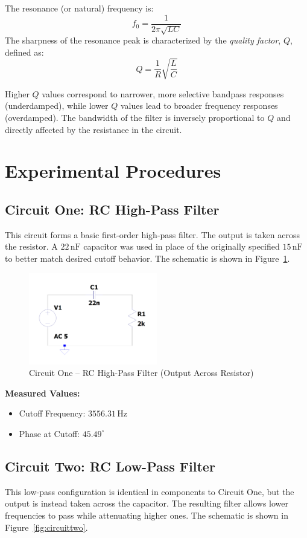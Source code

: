 \documentclass[12pt]{article}
\begin{document}
The resonance (or natural) frequency is:
\[
	f_0 = \frac{1}{2\pi\sqrt{LC}}
\]
The sharpness of the resonance peak is characterized by the \textit{quality factor}, $Q$, defined as:
\[
	Q = \frac{1}{R} \sqrt{\frac{L}{C}}
\]

Higher $Q$ values correspond to narrower, more selective bandpass responses (underdamped), while lower $Q$ values lead to broader frequency responses (overdamped). The bandwidth of the filter is inversely proportional to $Q$ and directly affected by the resistance in the circuit.
\section{Experimental Procedures}

\subsection{Circuit One: RC High-Pass Filter}
This circuit forms a basic first-order high-pass filter. The output is taken across the resistor. A $22\,\mathrm{nF}$ capacitor was used in place of the originally specified $15\,\mathrm{nF}$ to better match desired cutoff behavior. The schematic is shown in Figure~\ref{fig:circuitone}.

\begin{figure}[H]
	\centering
	\includegraphics[width=0.5\textwidth]{e6_01}
	\caption{Circuit One – RC High-Pass Filter (Output Across Resistor)}
	\label{fig:circuitone}
\end{figure}

\noindent \textbf{Measured Values:}
\begin{itemize}
	\item Cutoff Frequency: $3556.31\,\mathrm{Hz}$
	\item Phase at Cutoff: $45.49^\circ$
\end{itemize}

\subsection{Circuit Two: RC Low-Pass Filter}
This low-pass configuration is identical in components to Circuit One, but the output is instead taken across the capacitor. The resulting filter allows lower frequencies to pass while attenuating higher ones. The schematic is shown in Figure~\ref{fig:circuittwo}.
\end{document}
